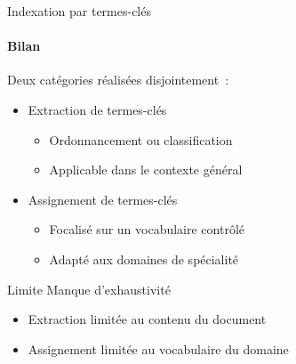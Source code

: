     \begin{frame}{Indexation par termes-clés}\framesubtitle{Bilan}
    Deux catégories réalisées disjointement~:
    \begin{itemize}
      \item{Extraction de termes-clés}
      \begin{itemize}
        \item{Ordonnancement ou classification}
        \item{Applicable dans le contexte général}
      \end{itemize}
      \item{Assignement de termes-clés}
      \begin{itemize}
        \item{Focalisé sur un vocabulaire contrôlé}
        \item{Adapté aux domaines de spécialité}
      \end{itemize}
    \end{itemize}


    \vspace{1em}

    \begin{alertblock}{Limite}
      Manque d'exhaustivité
      \begin{itemize}
        \item{Extraction limitée au contenu du document}
        \item{Assignement limitée au vocabulaire du domaine}
      \end{itemize}
    \end{alertblock}
  \end{frame}

